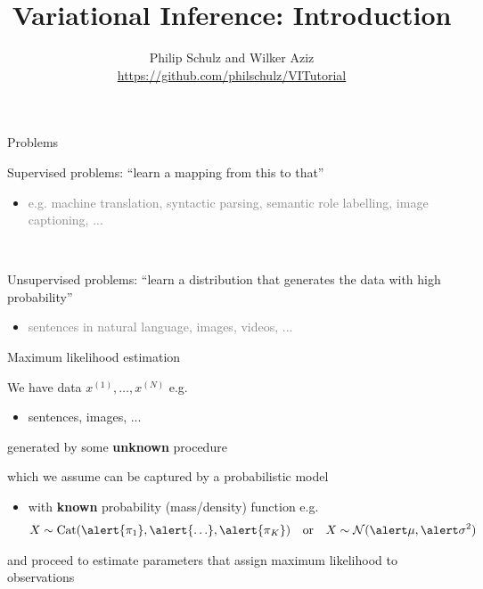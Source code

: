 \documentclass[14pt]{beamer}
\title{Variational Inference: Introduction}
\date{}
\author[Schulz and Aziz]{Philip Schulz and Wilker Aziz \\
\url{https://github.com/philschulz/VITutorial}}
\begin{document}
\frame{\titlepage}

\frame{\tableofcontents}


\begin{frame}{Problems}



Supervised problems: \alert{``learn a mapping from this to that''}
\begin{itemize}
	\item \textcolor{gray}{e.g. machine translation, syntactic parsing, semantic role labelling, image captioning, ...}
\end{itemize}

~

Unsupervised problems: \alert{``learn a distribution that generates the data with high probability''}
\begin{itemize}
	\item \textcolor{gray}{sentences in natural language, images, videos, ...}
\end{itemize}



\end{frame}



\begin{frame}{Maximum likelihood estimation}

\small

We have data $x^{(1)}, \ldots, x^{(N)}$ e.g.  \\
\begin{itemize}
	\item sentences, images, ...
\end{itemize}
generated by some {\bf unknown} procedure

\pause

which we assume can be captured by a probabilistic model
\begin{itemize}
	\item with {\bf known} probability (mass/density) function e.g.
	\begin{align*}
    X \sim \Cat(\alert{\pi_1}, \alert{\ldots}, \alert{\pi_K}) & & \text{or} & & X \sim \mathcal N(\alert\mu, \alert\sigma^2)
    \end{align*}    
\end{itemize}
and proceed to \alert{estimate parameters} that assign maximum likelihood to observations

\end{frame}
\end{document}

